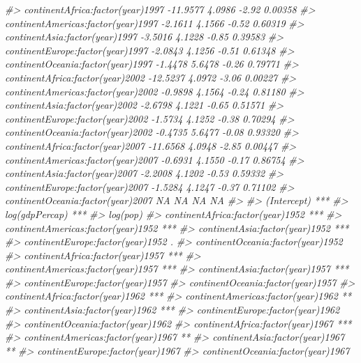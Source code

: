 \documentclass[]{book}
\newenvironment{Shaded}{\begin{snugshade}}{\end{snugshade}}
\newcommand{\CommentTok}[1]{\textcolor[rgb]{0.56,0.35,0.01}{\textit{#1}}}
\begin{document}
\begin{Shaded}
\begin{Highlighting}[]
\CommentTok{#> continentAfrica:factor(year)1997   -11.9577     4.0986   -2.92  0.00358}
\CommentTok{#> continentAmericas:factor(year)1997  -2.1611     4.1566   -0.52  0.60319}
\CommentTok{#> continentAsia:factor(year)1997      -3.5016     4.1228   -0.85  0.39583}
\CommentTok{#> continentEurope:factor(year)1997    -2.0843     4.1256   -0.51  0.61348}
\CommentTok{#> continentOceania:factor(year)1997   -1.4478     5.6478   -0.26  0.79771}
\CommentTok{#> continentAfrica:factor(year)2002   -12.5237     4.0972   -3.06  0.00227}
\CommentTok{#> continentAmericas:factor(year)2002  -0.9898     4.1564   -0.24  0.81180}
\CommentTok{#> continentAsia:factor(year)2002      -2.6798     4.1221   -0.65  0.51571}
\CommentTok{#> continentEurope:factor(year)2002    -1.5734     4.1252   -0.38  0.70294}
\CommentTok{#> continentOceania:factor(year)2002   -0.4735     5.6477   -0.08  0.93320}
\CommentTok{#> continentAfrica:factor(year)2007   -11.6568     4.0948   -2.85  0.00447}
\CommentTok{#> continentAmericas:factor(year)2007  -0.6931     4.1550   -0.17  0.86754}
\CommentTok{#> continentAsia:factor(year)2007      -2.2008     4.1202   -0.53  0.59332}
\CommentTok{#> continentEurope:factor(year)2007    -1.5284     4.1247   -0.37  0.71102}
\CommentTok{#> continentOceania:factor(year)2007        NA         NA      NA       NA}
\CommentTok{#>                                       }
\CommentTok{#> (Intercept)                        ***}
\CommentTok{#> log(gdpPercap)                     ***}
\CommentTok{#> log(pop)                              }
\CommentTok{#> continentAfrica:factor(year)1952   ***}
\CommentTok{#> continentAmericas:factor(year)1952 ***}
\CommentTok{#> continentAsia:factor(year)1952     ***}
\CommentTok{#> continentEurope:factor(year)1952   .  }
\CommentTok{#> continentOceania:factor(year)1952     }
\CommentTok{#> continentAfrica:factor(year)1957   ***}
\CommentTok{#> continentAmericas:factor(year)1957 ***}
\CommentTok{#> continentAsia:factor(year)1957     ***}
\CommentTok{#> continentEurope:factor(year)1957      }
\CommentTok{#> continentOceania:factor(year)1957     }
\CommentTok{#> continentAfrica:factor(year)1962   ***}
\CommentTok{#> continentAmericas:factor(year)1962 ** }
\CommentTok{#> continentAsia:factor(year)1962     ***}
\CommentTok{#> continentEurope:factor(year)1962      }
\CommentTok{#> continentOceania:factor(year)1962     }
\CommentTok{#> continentAfrica:factor(year)1967   ***}
\CommentTok{#> continentAmericas:factor(year)1967 ** }
\CommentTok{#> continentAsia:factor(year)1967     ** }
\CommentTok{#> continentEurope:factor(year)1967      }
\CommentTok{#> continentOceania:factor(year)1967     }

\end{Highlighting}
\end{Shaded}
\end{document}
